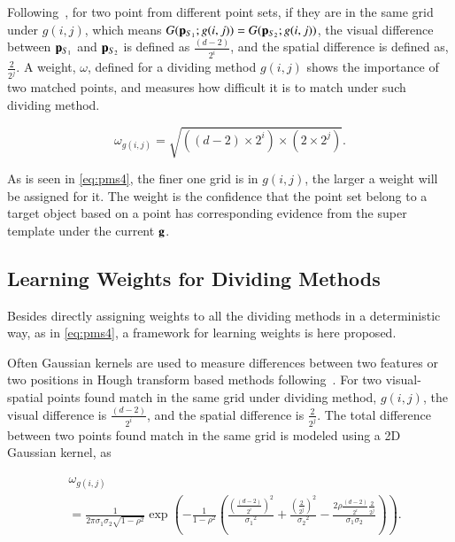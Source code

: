\documentclass[paper]{ieice}
\begin{document}
Following~\cite{pmk}, for two point from different point sets, if they are in the same grid under $g(i,j)$, which means $G({\bf p}_{S_1};g(i,j))=G({\bf p}_{S_2};g(i,j))$, the visual difference between ${\bf p}_{S_1}$ and ${\bf p}_{S_2}$  is defined as $ \frac {(d-2)}{2^i}$, and the spatial difference is defined as, $ \frac 2 {2^j}$.
A weight, $\omega$, defined for a dividing method $g(i,j)$ shows the importance of two matched points, and measures how difficult it is to match under such dividing method.

\begin{equation}
\label{eq:pms4}
\omega_{g(i,j)}=\sqrt{ ((d-2)\times{2^i})\times(2 \times {2^j})  }.
\end{equation}

As is seen in \ref{eq:pms4}, the finer one grid is in $g(i,j)$, the larger a weight will be assigned for it. The weight is the confidence that the point set belong to a target object based on a point has corresponding evidence from the super template under the current $\bf g$.

\subsection{Learning Weights for Dividing Methods}
Besides directly assigning weights to all the dividing methods in a deterministic way, as in \ref{eq:pms4}, a framework for learning weights is here proposed.

Often Gaussian kernels are used to measure differences between two features or two positions in Hough transform based methods following~\cite{lb1}.
For two visual-spatial points found match in the same grid under dividing method, $g(i,j)$,
the visual difference  is  $ \frac {(d-2)}{2^i}$, and the spatial difference is  $ \frac 2 {2^j}$.
The total difference between two points found match in the same grid is modeled using a 2D Gaussian kernel, as

\begin{equation}
\label{eq:pms5}
\begin{aligned}
&\omega_{g(i,j)}\\&=\frac 1 {2 \pi \sigma_1 \sigma_2 \sqrt{1-\rho^2} }\exp(- \frac 1 {1-\rho^2} ( \frac {(\frac {(d-2)}{2^i})^2} {{\sigma_1}^2}
+ \frac {(\frac {2}{2^j})^2} {{\sigma_2}^2}  - \frac {2 \rho \frac {(d-2)}{2^i}  \frac 2 {2^j}}{\sigma_1 \sigma_2} )).
\end{aligned}
\end{equation}

\end{document}
